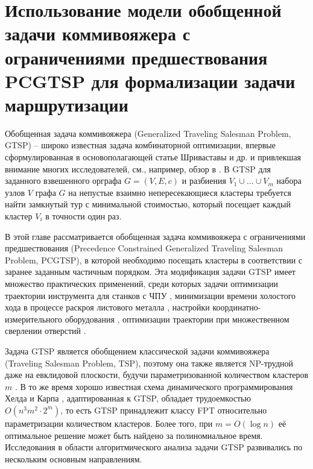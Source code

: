 
\section{%
Использование модели обобщенной задачи коммивояжера
с ограничениями предшествования
PCGTSP
для формализации задачи маршрутизации
}
\label{sec:pcgtsp.intro}

Обобщенная задача коммивояжера
(Generalized Traveling Salesman Problem, GTSP)
-- широко известная задача комбинаторной оптимизации,
впервые сформулированная в основополагающей статье Шриваставы и др.
\cite{SKGS1969}
и привлекшая внимание многих исследователей,
см., например, обзор в
\cite{GutinPunnen2007}.
В GTSP для заданного взвешенного орграфа
$ G = (V, E, c) $
и разбиения
$ V_1 \cup \ldots \cup V_m $
набора узлов $V$ графа $G$ на непустые взаимно непересекающиеся кластеры
требуется найти замкнутый тур с минимальной стоимостью,
который посещает каждый кластер
$V_i$
в точности один раз.

В этой главе рассматривается
обобщенная задача коммивояжера с ограничениями предшествования
(Precedence Constrained Generalized Traveling Salesman Problem, PCGTSP),
в которой необходимо посещать кластеры
в соответствии с заранее заданным частичным порядком.
Эта модификация задачи GTSP имеет множество практических применений, среди которых задачи
оптимизации траектории инструмента для станков с ЧПУ  \cite{CASTELINO2003173},
минимизации времени холостого хода в процессе раскроя листового металла \cite{bi:RoMa,Makarovskikh20181171},
настройки координатно-измерительного оборудования \cite{SALMAN2016138},
оптимизации траектории при множественном сверлении отверстий \cite{DEWIL2019}.

Задача GTSP является обобщением классической задачи коммивояжера
(Traveling Salesman Problem, TSP),
поэтому она также является NP-трудной
даже на евклидовой плоскости,
будучи параметризованной количеством кластеров
$m$
\cite{Papa77}.
В то же время хорошо известная схема динамического программирования Хелда и Карпа
\cite{HeldKarp1962},
адаптированная к GTSP,
обладает трудоемкостью
$ O (n ^ 3m ^ 2 \cdot 2 ^ m) $,
то есть
GTSP принадлежит классу FPT
относительно параметризации количеством кластеров.
Более того, при
$ m = O (\log n) $
её оптимальное решение может быть найдено за полиномиальное время.
Исследования в области алгоритмического анализа задачи GTSP
развивались по нескольким основным направлениям.

